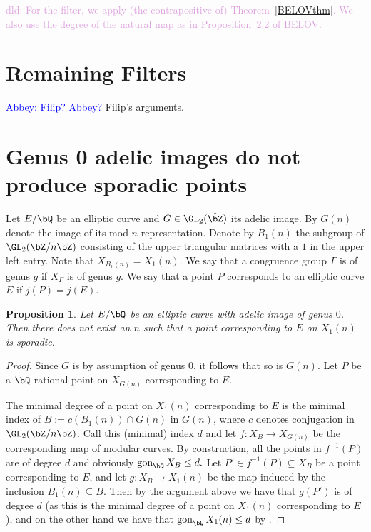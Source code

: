 \documentclass[11pt,reqno]{amsart}
\theoremstyle{plain}
\newtheorem{proposition}[theorem]{Proposition}
\theoremstyle{definition}
\DeclareMathOperator{\gon}{gon}
\newcommand{\Q}{\bQ}
\newcommand{\Z}{\bZ}
\newcommand{\abbey}[1]{\textcolor{blue}{Abbey: #1}}
\newcommand{\dld}[1]{\textcolor{Plum}{dld: #1}}
\begin{document}
\dld{For the filter, we apply (the contrapositive of) Theorem~\ref{BELOVthm}.
We also use the degree of the natural map as in Proposition~2.2 of BELOV.}

\section{Remaining Filters}
\abbey{Filip? Abbey?}
Filip's arguments.



\section{Genus 0 adelic images do not produce sporadic points}

Let $E/ \Q$ be an elliptic curve and $G\in \GL_2(\hat \Z)$ its adelic image. By $G(n)$ denote the image of its mod $n$ representation. Denote by $B_1(n)$ the subgroup of $\GL_2(\Z/n\Z)$ consisting of the upper triangular matrices with a $1$ in the upper left entry. Note that $X_{B_1(n)}=X_1(n)$. We say that a congruence group $\Gamma$ is of genus $g$ if $X_\Gamma$ is of genus $g$. We say that a point $P$ corresponds to an elliptic curve $E$ if $j(P)=j(E)$.

\begin{proposition}
Let $E/\Q$ be an elliptic curve with adelic image of genus $0$. Then there does not exist an $n$ such that a point corresponding to $E$ on $X_1(n)$ is sporadic.
\end{proposition}
\begin{proof}
Since $G$ is by assumption of genus $0$, it follows that so is $G(n)$. Let $P$ be a $\Q$-rational point on $X_{G(n)}$ corresponding to $E$.


The minimal degree of a point on $X_1(n)$ corresponding to $E$ is the minimal index of $B:=c(B_1(n))\cap G(n)$ in $G(n)$, where $c$ denotes conjugation in $\GL_2(\Z /n \Z)$.
Call this (minimal) index $d$ and let $f:X_{B}\rightarrow X_{G(n)}$ be the corresponding map of modular curves. By construction, all the points in $f^{-1}(P)$ are of degree $d$ and obviously $\gon_\Q X_{B}\leq d.$ Let $P'\in f^{-1}(P) \subseteq X_{B}$ be a point corresponding to $E$, and let $g:X_{B}\rightarrow X_1(n)$ be the map induced by the inclusion $B_1(n) \subseteq B$. Then by the argument above we have that $g(P')$ is of degree $d$ (as this is the minimal degree of a point on $X_1(n)$ corresponding to $E$), and on the other hand we have that $\gon_\Q X_1(n)\leq d$ by \cite[Proposition A.1 (vii)]{Poonen:gonality}.
\end{proof}




\vspace{20 mm}


\end{document}
